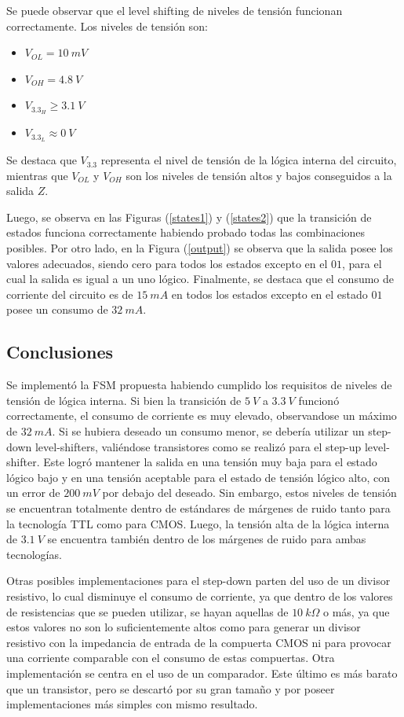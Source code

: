 Se puede observar que el level shifting de niveles de tensión funcionan correctamente. Los niveles de tensión son:
\begin{itemize}
\item $V_{OL} = 10 \ mV$
\item $V_{OH} = 4.8 \ V$
\item $V_{3.3_{H}} \geq 3.1 \ V$
\item $V_{3.3_{L}} \approx 0 \ V$
\end{itemize}

Se destaca que $V_{3.3}$ representa el nivel de tensión de la lógica interna del circuito, mientras que $V_{OL}$ y $V_{OH}$ son los niveles de tensión altos y bajos conseguidos a la salida $Z$.

Luego, se observa en las Figuras (\ref{states1}) y (\ref{states2}) que la transición de estados funciona correctamente habiendo probado todas las combinaciones posibles. Por otro lado, en la Figura (\ref{output}) se observa que la salida posee los valores adecuados, siendo cero para todos los estados excepto en el $01$, para el cual la salida es igual a un uno lógico. Finalmente, se destaca que el consumo de corriente del circuito es de $15 \ mA$ en todos los estados excepto en el estado $01$ posee un consumo de $32 \ mA$.

\subsection{Conclusiones}

Se implementó la FSM propuesta habiendo cumplido los requisitos de niveles de tensión de lógica interna. Si bien la transición de $5 \ V$ a $3.3 \ V$ funcionó correctamente, el consumo de corriente es muy elevado, observandose un máximo de $32 \ mA$. Si se hubiera deseado un consumo menor, se debería utilizar un step-down level-shifters, valiéndose transistores como se realizó para el step-up level-shifter. Este logró mantener la salida en una tensión muy baja para el estado lógico bajo y en una tensión aceptable para el estado de tensión lógico alto, con un error de $200 \ mV$ por debajo del deseado. Sin embargo, estos niveles de tensión se encuentran totalmente dentro de estándares de márgenes de ruido tanto para la tecnología TTL como para CMOS. Luego, la tensión alta de la lógica interna de $3.1 \ V$ se encuentra también dentro de los márgenes de ruido para ambas tecnologías.

Otras posibles implementaciones para el step-down parten del uso de un divisor resistivo, lo cual disminuye el consumo de corriente, ya que dentro de los valores de resistencias que se pueden utilizar, se hayan aquellas de $10 \ k\Omega$ o más, ya que estos valores no son lo suficientemente altos como para generar un divisor resistivo con la impedancia de entrada de la compuerta CMOS ni para provocar una corriente comparable con el consumo de estas compuertas. Otra implementación se centra en el uso de un comparador. Este último es más barato que un transistor, pero se descartó por su gran tamaño y por poseer implementaciones más simples con mismo resultado.